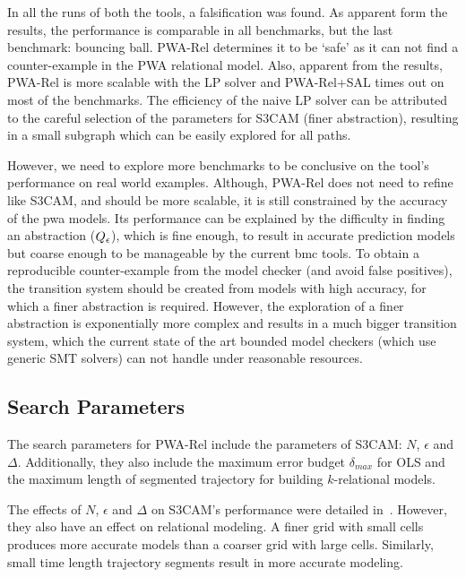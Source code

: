 
In all the runs of both the tools, a falsification was found. As
apparent form the results, the performance is comparable in all
benchmarks, but the last benchmark: bouncing ball. PWA-Rel determines
it to be `safe' as it can not find a counter-example in the PWA
relational model. Also, apparent from the results, PWA-Rel is more
scalable with the LP solver and PWA-Rel+SAL times out on most of the
benchmarks.  The efficiency of the naive LP solver can be attributed
to the careful selection of the parameters for S3CAM (finer
abstraction), resulting in a small subgraph which can be easily
explored for all paths.

However, we need to explore more benchmarks to be conclusive on the
tool's performance on real world examples. Although, PWA-Rel does not
need to refine like S3CAM, and should be more scalable, it is still
constrained by the accuracy of the pwa models. Its performance can be
explained by the difficulty in finding an abstraction
($Q_\epsilon$), which is fine enough, to result in accurate
prediction models but coarse enough to be manageable by the current
bmc tools.  To obtain a reproducible counter-example from the model
checker (and avoid false positives), the transition system should be
created from models with high accuracy, for which a finer abstraction
is required.  However, the exploration of a finer abstraction is
exponentially more complex and results in a much bigger transition
system, which the current state of the art bounded model checkers
(which use generic SMT solvers) can not handle under reasonable
resources.

\subsection{Search Parameters}

The search parameters for PWA-Rel include the parameters of S3CAM:
$N$, $\epsilon$ and $\Delta$. Additionally, they also include the
maximum error budget $\delta_{max}$ for OLS and the maximum length of
segmented trajectory for building $k$-relational models.

The effects of $N$, $\epsilon$ and $\Delta$
on S3CAM's performance were detailed in~\cite{zutshi2014multiple}. However, they also have an effect on
relational modeling. A finer grid with small cells produces more
accurate models than a coarser grid with large cells. Similarly,
small time length trajectory segments result in more accurate
modeling.

